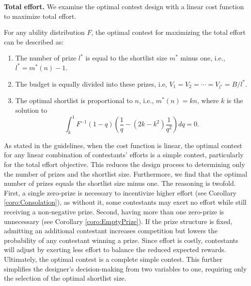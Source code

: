 

\noindent \textbf{Total effort.}
We examine the optimal contest design with a linear cost function to maximize total effort. %

\begin{theorem}
    For any ability distribution $F$, the optimal contest for maximizing the total effort can be described as:
    \begin{enumerate}
        \item The number of prize $l^*$ is equal to the shortlist size $m^*$ minus one, i.e., $l^*=m^*(n)-1$.
        \item The budget is equally divided into these prizes, i.e, $V_1=V_2=\cdots= V_{l^*}=B/l^*$.
        \item The optimal shortlist is proportional to $n$, i.e., $m^*(n)=kn$, where $k$ is the solution to 
        \[
            \int_k^1 F^{-1}(1-q)(\frac{1}{q}-(2k-k^2)\frac{1}{q^2})dq=0.
        \]
    \end{enumerate}
\end{theorem}

As stated in the guidelines, when the cost function is linear, the optimal contest for any linear combination of contestants' efforts is a simple contest, particularly for the total effort objective. This reduces the design process to determining only the number of prizes and the shortlist size.
Furthermore, we find that the optimal number of prizes equals the shortlist size minus one. The reasoning is twofold. First, a single zero-prize is necessary to incentivize higher effort (see Corollary \ref{coro:Consolation}), as without it, some contestants may exert no effort while still receiving a non-negative prize. Second, having more than one zero-prize is unnecessary (see Corollary \ref{coro:EmptyPrize}). If the prize structure is fixed, admitting an additional contestant increases competition but lowers the probability of any contestant winning a prize. Since effort is costly, contestants will adjust by exerting less effort to balance the reduced expected rewards.
Ultimately, the optimal contest is a complete simple contest. This further simplifies the designer's decision-making from two variables to one, requiring only the selection of the optimal shortlist size.

